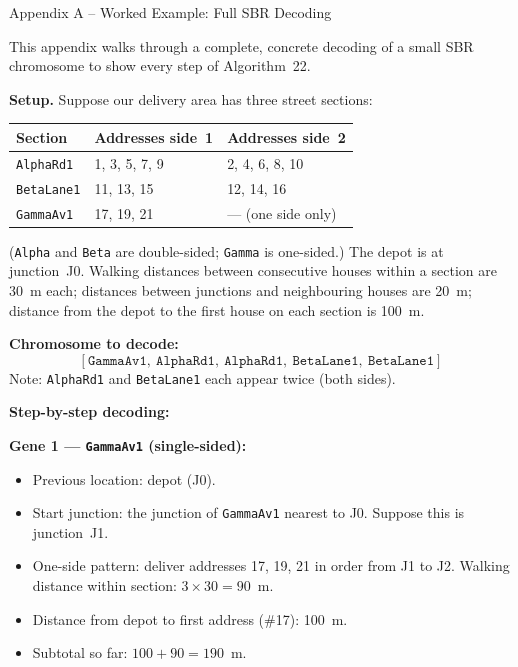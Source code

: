 \documentclass[aspectratio=169,10pt]{beamer}
\begin{document}
\begin{frame}[allowframebreaks]{Appendix A -- Worked Example: Full SBR Decoding}

  This appendix walks through a complete, concrete decoding of a small
  SBR chromosome to show every step of Algorithm~22.

  \textbf{Setup.}  Suppose our delivery area has three street sections:
  \begin{center}
    \begin{tabular}{lll}
      \toprule
      Section & Addresses side~1 & Addresses side~2 \\
      \midrule
      \texttt{AlphaRd1}   & 1, 3, 5, 7, 9   & 2, 4, 6, 8, 10 \\
      \texttt{BetaLane1}  & 11, 13, 15      & 12, 14, 16 \\
      \texttt{GammaAv1}   & 17, 19, 21      & --- (one side only) \\
      \bottomrule
    \end{tabular}
  \end{center}
  (\texttt{Alpha} and \texttt{Beta} are double-sided; \texttt{Gamma} is
  one-sided.)  The depot is at junction~J0.  Walking distances between
  consecutive houses within a section are 30~m each; distances between
  junctions and neighbouring houses are 20~m; distance from the depot
  to the first house on each section is 100~m.

  \textbf{Chromosome to decode:}
  \[
    [\texttt{GammaAv1},\ \texttt{AlphaRd1},\ \texttt{AlphaRd1},\ \texttt{BetaLane1},\ \texttt{BetaLane1}]
  \]
  Note: \texttt{AlphaRd1} and \texttt{BetaLane1} each appear twice (both sides).

  \framebreak

  \textbf{Step-by-step decoding:}

  \textbf{Gene 1 --- \texttt{GammaAv1} (single-sided):}
  \begin{itemize}
    \item Previous location: depot (J0).
    \item Start junction: the junction of \texttt{GammaAv1} nearest to J0.
      Suppose this is junction~J1.
    \item One-side pattern: deliver addresses 17, 19, 21 in order from J1
      to J2.  Walking distance within section: $3 \times 30 = 90$~m.
    \item Distance from depot to first address (\#17): 100~m.
    \item Subtotal so far: $100 + 90 = 190$~m.
  \end{itemize}


\end{frame}
\end{document}
